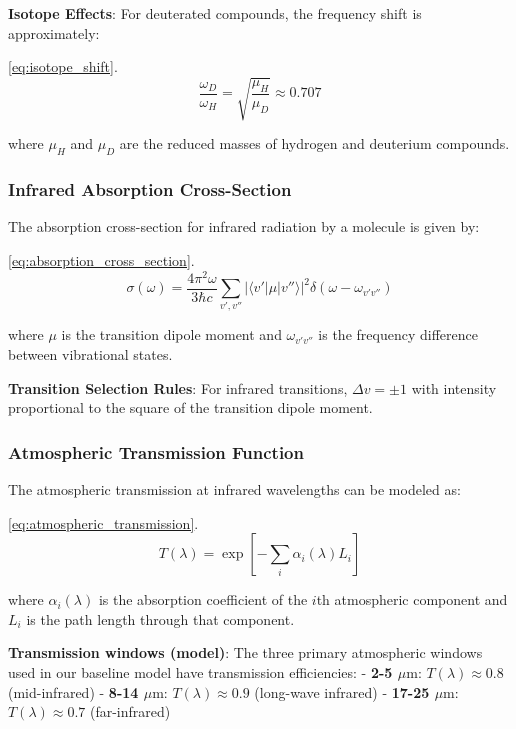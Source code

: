\documentclass[
  13pt,
  a4paperpaper,
  12pt]{article}
\begin{document}
\textbf{Isotope Effects}: For deuterated compounds, the frequency shift
is approximately:

\eqref{eq:isotope_shift}. \begin{equation}
\frac{\omega_D}{\omega_H} = \sqrt{\frac{\mu_H}{\mu_D}} \approx 0.707 \label{eq:isotope_shift}
\end{equation}

where \(\mu_H\) and \(\mu_D\) are the reduced masses of hydrogen and
deuterium compounds.

\subsubsection{Infrared Absorption
Cross-Section}\label{infrared-absorption-cross-section}

The absorption cross-section for infrared radiation by a molecule is
given by:

\eqref{eq:absorption_cross_section}. \begin{equation}
\sigma(\omega) = \frac{4\pi^2 \omega}{3\hbar c} \sum_{v',v''} |\langle v'|\mu|v''\rangle|^2 \delta(\omega - \omega_{v'v''}) \label{eq:absorption_cross_section}
\end{equation}

where \(\mu\) is the transition dipole moment and \(\omega_{v'v''}\) is
the frequency difference between vibrational states.

\textbf{Transition Selection Rules}: For infrared transitions,
\(\Delta v = \pm 1\) with intensity proportional to the square of the
transition dipole moment.

\subsubsection{Atmospheric Transmission
Function}\label{atmospheric-transmission-function}

The atmospheric transmission at infrared wavelengths can be modeled as:

\eqref{eq:atmospheric_transmission}. \begin{equation}
T(\lambda) = \exp\left[-\sum_i \alpha_i(\lambda) L_i\right] \label{eq:atmospheric_transmission}
\end{equation}

where \(\alpha_i(\lambda)\) is the absorption coefficient of the \(i\)th
atmospheric component and \(L_i\) is the path length through that
component.

\textbf{Transmission windows (model)}: The three primary atmospheric
windows used in our baseline model have transmission efficiencies: -
\textbf{2-5 \(\mu\mathrm{m}\)}: \(T(\lambda) \approx 0.8\)
(mid-infrared) - \textbf{8-14 \(\mu\mathrm{m}\)}:
\(T(\lambda) \approx 0.9\) (long-wave infrared) - \textbf{17-25
\(\mu\mathrm{m}\)}: \(T(\lambda) \approx 0.7\) (far-infrared)
\end{document}
